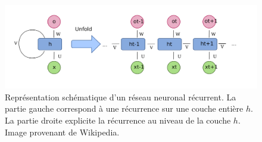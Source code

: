 \begin{figure}[h]
  \centering
  \includegraphics[width=14cm]{./Chapitre3/figures/rnn.png}
  \caption{Représentation schématique d'un réseau neuronal récurrent. La partie gauche correspond à une récurrence sur une couche entière $h$. La partie droite explicite la récurrence au niveau de la couche $h$. Image provenant de Wikipedia.}
  \label{fig:rnn}
\end{figure}
